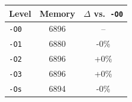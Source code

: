\begin{tabular*}{\columnwidth}{@{\extracolsep\fill}lcc@{\extracolsep\fill}}
\toprule
\textbf{Level} & \textbf{Memory} & \textbf{$\Delta$ vs.\ \texttt{-O0}} \\
\midrule
\texttt{-O0} & 6896 & -- \\
\texttt{-O1} & 6880 & -0\% \\
\texttt{-O2} & 6896 & +0\% \\
\texttt{-O3} & 6896 & +0\% \\
\texttt{-Os} & 6894 & -0\% \\
\bottomrule
\end{tabular*}
